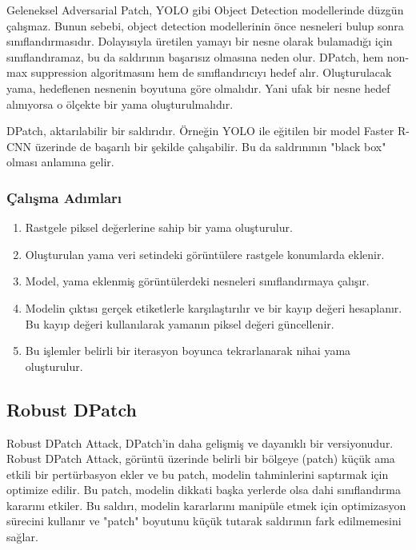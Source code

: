 Geleneksel Adversarial Patch, YOLO gibi Object Detection modellerinde düzgün çalışmaz. Bunun sebebi, object detection modellerinin önce nesneleri bulup sonra sınıflandırmasıdır. Dolayısıyla üretilen yamayı bir nesne olarak bulamadığı için sınıflandıramaz, bu da saldırının başarısız olmasına neden olur. DPatch, hem non-max suppression algoritmasını hem de sınıflandırıcıyı hedef alır. Oluşturulacak yama, hedeflenen nesnenin boyutuna göre olmalıdır. Yani ufak bir nesne hedef alınıyorsa o ölçekte bir yama oluşturulmalıdır. 

DPatch, aktarılabilir bir saldırıdır. Örneğin YOLO ile eğitilen bir model Faster R-CNN üzerinde de başarılı bir şekilde çalışabilir. Bu da saldrınının "black box" olması anlamına gelir. 

\subsubsection{Çalışma Adımları}

\begin{enumerate}
    \item Rastgele piksel değerlerine sahip bir yama oluşturulur.
    \item Oluşturulan yama veri setindeki görüntülere rastgele konumlarda eklenir.
    \item Model, yama eklenmiş görüntülerdeki nesneleri sınıflandırmaya çalışır.
    \item Modelin çıktısı gerçek etiketlerle karşılaştırılır ve bir kayıp değeri hesaplanır. Bu kayıp değeri kullanılarak yamanın piksel değeri güncellenir.
    \item Bu işlemler belirli bir iterasyon boyunca tekrarlanarak nihai yama oluşturulur.
\end{enumerate}

\newpage

\subsection{Robust DPatch}

Robust DPatch Attack, DPatch'in daha gelişmiş ve dayanıklı bir versiyonudur. Robust DPatch Attack, görüntü üzerinde belirli bir bölgeye (patch) küçük ama etkili bir pertürbasyon ekler ve bu patch, modelin tahminlerini saptırmak için optimize edilir. Bu patch, modelin dikkati başka yerlerde olsa dahi sınıflandırma kararını etkiler. Bu saldırı, modelin kararlarını manipüle etmek için optimizasyon sürecini kullanır ve "patch" boyutunu küçük tutarak saldırının fark edilmemesini sağlar.


